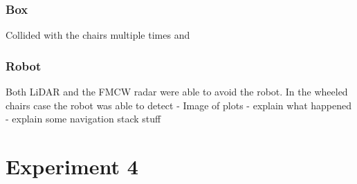 \subsubsection{Box}
Collided with the chairs multiple times and 
\subsubsection{Robot}
Both \ac{LiDAR} and the FMCW radar were able to avoid the robot. 
In the wheeled chairs case the robot was able to detect 
- Image of plots
- explain what happened
- explain some navigation stack stuff

\section {Experiment 4}